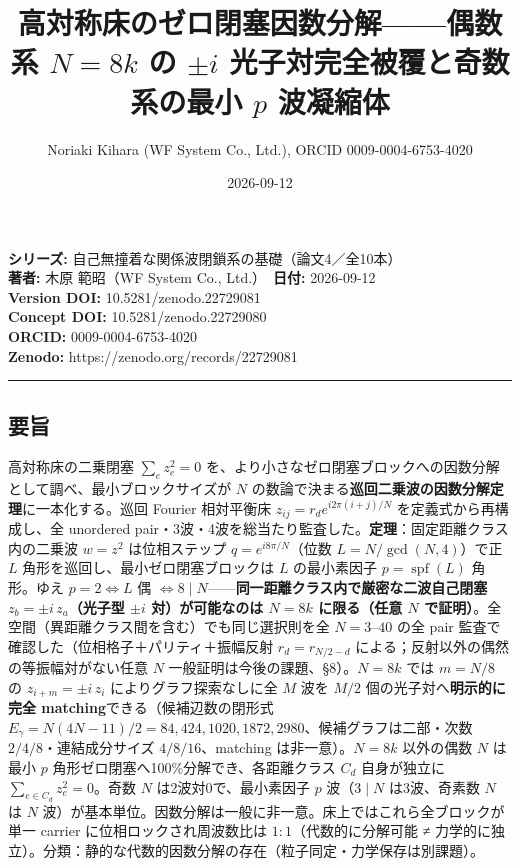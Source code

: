 \documentclass[
  a4paper,
]{ltjsarticle}
\title{高対称床のゼロ閉塞因数分解------偶数系 \(N=8k\) の \(\pm i\)
光子対完全被覆と奇数系の最小 \(p\) 波凝縮体}
\author{Noriaki Kihara (WF System Co., Ltd.), ORCID 0009-0004-6753-4020}
\date{2026-09-12}
\begin{document}
\maketitle

\textbf{シリーズ:} 自己無撞着な関係波閉鎖系の基礎（論文4／全10本）\\
\textbf{著者:} 木原 範昭（WF System Co., Ltd.）　\textbf{日付:}
2026-09-12\\
\textbf{Version DOI:} 10.5281/zenodo.22729081\\
\textbf{Concept DOI:} 10.5281/zenodo.22729080\\
\textbf{ORCID:} 0009-0004-6753-4020\\
\textbf{Zenodo:} https://zenodo.org/records/22729081\\

\begin{center}\rule{0.5\linewidth}{0.5pt}\end{center}

\subsection{要旨}\label{ux8981ux65e8}

高対称床の二乗閉塞 \(\sum_e z_e^2=0\)
を、より小さなゼロ閉塞ブロックへの因数分解として調べ、最小ブロックサイズが
\(N\) の数論で決まる\textbf{巡回二乗波の因数分解定理}に一本化する。巡回
Fourier 相対平衡床 \(z_{ij}=r_d e^{i2\pi(i+j)/N}\)
を定義式から再構成し、全 unordered
pair・3波・4波を総当たり監査した。\textbf{定理}：固定距離クラス内の二乗波
\(w=z^2\) は位相ステップ \(q=e^{i8\pi/N}\)（位数 \(L=N/\gcd(N,4)\)）で正
\(L\) 角形を巡回し、最小ゼロ閉塞ブロックは \(L\) の最小素因子
\(p=\operatorname{spf}(L)\) 角形。ゆえ \(p=2\iff L\) 偶
\(\iff 8\mid N\)------\textbf{同一距離クラス内で厳密な二波自己閉塞
\(z_b=\pm i\,z_a\)（光子型 \(\pm i\) 対）が可能なのは \(N=8k\)
に限る（任意 \(N\)
で証明）}。全空間（異距離クラス間を含む）でも同じ選択則を全
\(N=3\)--\(40\) の全 pair 監査で確認した（位相格子＋パリティ＋振幅反射
\(r_d=r_{N/2-d}\) による；反射以外の偶然の等振幅対がない任意 \(N\)
一般証明は今後の課題、§8）。\(N=8k\) では \(m=N/8\) の
\(z_{i+m}=\pm i\,z_i\) によりグラフ探索なしに全 \(M\) 波を \(M/2\)
個の光子対へ\textbf{明示的に完全 matching}できる（候補辺数の閉形式
\(E_\gamma=N(4N-11)/2=84,424,1020,1872,2980\)、候補グラフは二部・次数
\(2/4/8\)・連結成分サイズ \(4/8/16\)、matching は非一意）。\(N=8k\)
以外の偶数 \(N\) は最小 \(p\) 角形ゼロ閉塞へ100\%分解でき、各距離クラス
\(C_d\) 自身が独立に \(\sum_{e\in C_d}z_e^2=0\)。奇数 \(N\)
は2波対0で、最小素因子 \(p\) 波（\(3\mid N\) は3波、奇素数 \(N\) は
\(N\)
波）が基本単位。因数分解は一般に非一意。床上ではこれら全ブロックが単一
carrier に位相ロックされ周波数比は \(1{:}1\)（代数的に分解可能 ≠
力学的に独立）。分類：静的な代数的因数分解の存在（粒子同定・力学保存は別課題）。
\end{document}
